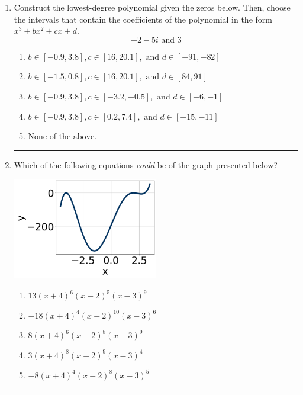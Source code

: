 \documentclass[14pt]{extbook}
\newcommand{\litem}[1]{\item#1\hspace*{-1cm}\rule{\textwidth}{0.4pt}}
\begin{document}
\begin{enumerate}
\litem{
Construct the lowest-degree polynomial given the zeros below. Then, choose the intervals that contain the coefficients of the polynomial in the form $x^3+bx^2+cx+d$.\[ -2 - 5 i \text{ and } 3 \]\begin{enumerate}[label=\Alph*.]
\item \( b \in [-0.9, 3.8], c \in [16, 20.1], \text{ and } d \in [-91, -82] \)
\item \( b \in [-1.5, 0.8], c \in [16, 20.1], \text{ and } d \in [84, 91] \)
\item \( b \in [-0.9, 3.8], c \in [-3.2, -0.5], \text{ and } d \in [-6, -1] \)
\item \( b \in [-0.9, 3.8], c \in [0.2, 7.4], \text{ and } d \in [-15, -11] \)
\item \( \text{None of the above.} \)

\end{enumerate} }
\litem{
Which of the following equations \textit{could} be of the graph presented below?
\begin{center}
    \includegraphics[width=0.5\textwidth]{../Figures/polyGraphToFunctionC.png}
\end{center}
\begin{enumerate}[label=\Alph*.]
\item \( 13(x + 4)^{6} (x - 2)^{5} (x - 3)^{9} \)
\item \( -18(x + 4)^{4} (x - 2)^{10} (x - 3)^{6} \)
\item \( 8(x + 4)^{6} (x - 2)^{8} (x - 3)^{9} \)
\item \( 3(x + 4)^{8} (x - 2)^{9} (x - 3)^{4} \)
\item \( -8(x + 4)^{4} (x - 2)^{8} (x - 3)^{5} \)


\end{enumerate}}
\end{enumerate}
\end{document}
